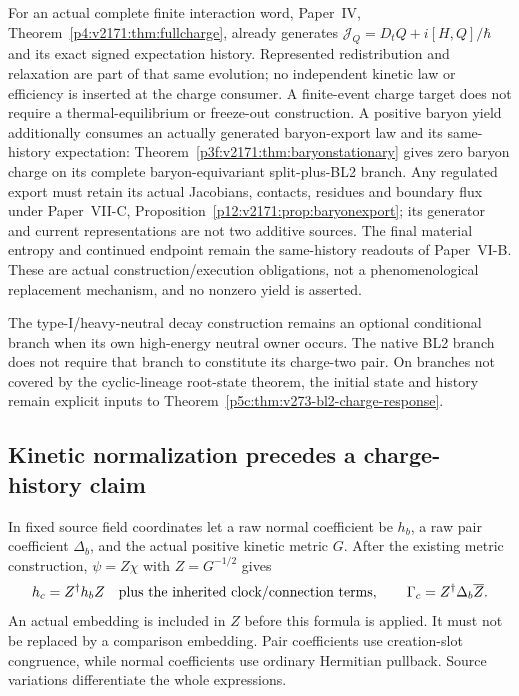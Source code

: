 \documentclass[12pt,a4paper]{article}
\begin{document}
\begin{remark}
\label{p5c:rem:v2187-native-charge-yield-scope}
For an actual complete finite interaction word, Paper~IV,
Theorem~\ref{p4:v2171:thm:fullcharge}, already generates
\(\mathcal J_Q=D_tQ+i[H,Q]/\hbar\) and its exact signed expectation history.
Represented redistribution and relaxation are part of that same evolution;
no independent kinetic law or efficiency is inserted at the charge consumer.
A finite-event charge target does not require a thermal-equilibrium or
freeze-out construction.  A positive baryon yield additionally consumes an
actually generated baryon-export law and its same-history expectation:
Theorem~\ref{p3f:v2171:thm:baryonstationary} gives zero baryon charge on its
complete baryon-equivariant split-plus-BL2 branch.  Any regulated export must
retain its actual Jacobians, contacts, residues and boundary flux under
Paper~VII-C, Proposition~\ref{p12:v2171:prop:baryonexport}; its generator and
current representations are not two additive sources.  The final material
entropy and continued endpoint remain the same-history readouts of
Paper~VI-B.  These are actual construction/execution obligations, not a
phenomenological replacement mechanism, and no nonzero yield is asserted.
\end{remark}

\begin{remark}
\label{p5c:rem:v280-heavy-neutral-generic-scope}
The type-I/heavy-neutral decay construction remains an optional conditional
branch when its own high-energy neutral owner occurs.  The native BL2 branch
does not require that branch to constitute its charge-two pair.  On branches
not covered by the cyclic-lineage root-state theorem, the initial state and
history remain explicit inputs to Theorem~\ref{p5c:thm:v273-bl2-charge-response}.
\end{remark}

\subsection{Kinetic normalization precedes a charge-history claim}
In fixed source field coordinates let a raw normal coefficient be $h_b$,
a raw pair coefficient $\Delta_b$, and the actual positive kinetic metric
$G$. After the existing metric construction, $\psi=Z\chi$ with
$Z=G^{-1/2}$ gives
\begin{equation}
 h_c=Z^\dagger h_bZ\quad\hbox{plus the inherited clock/connection terms},
 \qquad
 \Gamma_c=Z^\dagger\Delta_b\overline Z.
 \label{p5c:v2171:eq:normalization}
\end{equation}
An actual embedding is included in $Z$ before this formula is applied.
It must not be replaced by a comparison embedding. Pair coefficients use
creation-slot congruence, while normal coefficients use ordinary Hermitian
pullback. Source variations differentiate the whole expressions.
\end{document}
